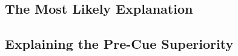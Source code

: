 \subsection{The Most Likely Explanation}
\label{subsec:discuss_explanation}

%
%
%
%
%
%
%


\subsection{Explaining the Pre-Cue Superiority}
\label{subsec:discuss_precue}

%
%
%
%
%
%
%


